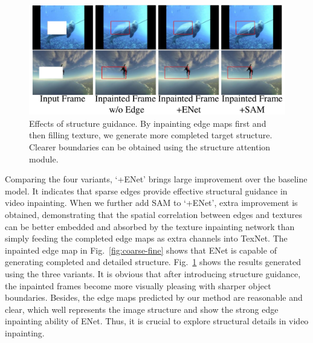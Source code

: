 \begin{figure}[!ht]
	\centering
	\includegraphics[width=0.97\columnwidth]{edgevis} %
	\caption{Effects of structure guidance. By inpainting edge maps first and then filling texture, we generate more completed target structure. Clearer boundaries can be obtained using the structure attention module.}
	\label{edgevis}
\end{figure}

 
 
Comparing the four variants, `+ENet' brings large improvement over the baseline model.
It indicates that sparse edges provide effective structural guidance in video inpainting.
When we further add SAM to `+ENet', extra improvement is obtained, demonstrating that the spatial correlation between edges and textures can be better embedded and absorbed by the texture inpainting network than simply feeding the completed edge maps as extra channels into TexNet.
The inpainted edge map in Fig.~\ref{fig:coarse-fine} shows that ENet is capable of generating completed and detailed structure.
Fig.~\ref{edgevis} shows the results generated using the three variants. 
It is obvious that after introducing structure guidance, the inpainted frames become more visually pleasing with sharper object boundaries. 
Besides, the edge maps predicted by our method are reasonable and clear, which well represents the image structure and show the strong edge inpainting ability of ENet. 
Thus, it is crucial to explore structural details in video inpainting.




